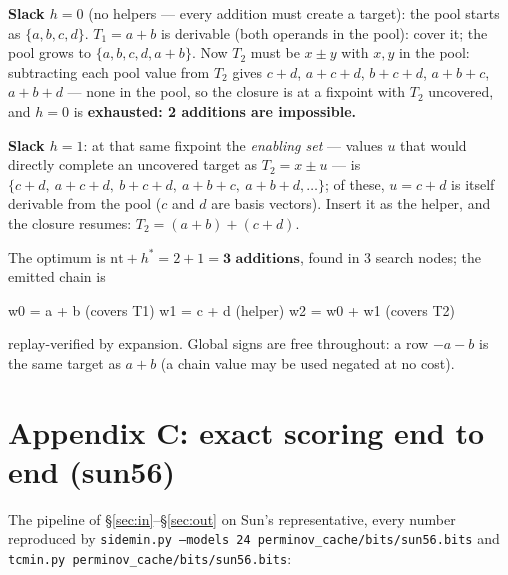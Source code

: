 \documentclass[10pt]{article}
\begin{document}
\textbf{Slack $h = 0$} (no helpers --- every addition must create a
target): the pool starts as $\{a, b, c, d\}$. $T_1 = a + b$ is
derivable (both operands in the pool): cover it; the pool grows to
$\{a, b, c, d, a{+}b\}$. Now $T_2$ must be $x \pm y$ with $x, y$ in the
pool: subtracting each pool value from $T_2$ gives $c{+}d$, $a{+}c{+}d$,
$b{+}c{+}d$, $a{+}b{+}c$, $a{+}b{+}d$ --- none in the pool, so the
closure is at a fixpoint with $T_2$ uncovered, and $h = 0$ is
\textbf{exhausted: 2 additions are impossible.}

\textbf{Slack $h = 1$}: at that same fixpoint the \emph{enabling set}
--- values $u$ that would directly complete an uncovered target as
$T_2 = x \pm u$ --- is $\{c{+}d,\ a{+}c{+}d,\ b{+}c{+}d,\ a{+}b{+}c,\
a{+}b{+}d, \dots\}$; of these, $u = c + d$ is itself derivable from the
pool ($c$ and $d$ are basis vectors). Insert it as the helper, and the
closure resumes: $T_2 = (a{+}b) + (c{+}d)$.

The optimum is $\mathrm{nt} + h^{*} = 2 + 1 = \textbf{3 additions}$,
found in 3 search nodes; the emitted chain is

\begin{Code}
w0 = a + b        (covers T1)
w1 = c + d        (helper)
w2 = w0 + w1      (covers T2)
\end{Code}

\noindent replay-verified by expansion. Global signs are free
throughout: a row $-a - b$ is the same target as $a + b$ (a chain value
may be used negated at no cost).

\section*{Appendix C: exact scoring end to end (sun56)}

The pipeline of \S\ref{sec:in}--\S\ref{sec:out} on Sun's
representative, every number reproduced by \texttt{sidemin.py --models
24 perminov\_cache/bits/sun56.bits} and \texttt{tcmin.py
perminov\_cache/bits/sun56.bits}:
\end{document}
